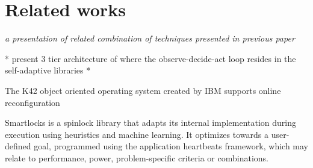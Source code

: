 
\section{Related works}
\label{sec:related}

\emph{a presentation of related combination of techniques presented in previous paper}

* present 3 tier architecture of \cite{evolvable} where the observe-decide-act loop resides in the self-adaptive libraries *

The K42 object oriented operating system created by IBM supports online reconfiguration \cite{evolvable}

Smartlocks is a spinlock library that adapts its internal implementation during execution using heuristics and machine learning. It optimizes towards a user-defined goal, programmed using the application heartbeats framework, which may relate to performance, power, problem-specific criteria or combinations. \cite{reconfigurable}

